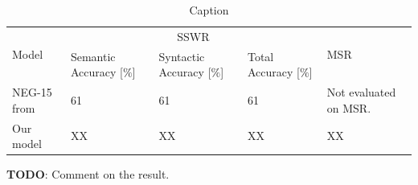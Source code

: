 \begin{table}[h]
    \centering
    \begin{tabular}{@{}p{4cm}p{2.25cm}p{2.25cm}p{2.25cm}p{4cm}@{}}
        \toprule
        \multirow{2}{4cm}{\centering Model} &
        \multicolumn{3}{c}{SSWR \cite{mikolov2013a}} &
        \multirow{2}{4cm}{\centering MSR \cite{mikolov-etal-2013-linguistic}} \\
        \cline{2-4} & Semantic Accuracy [$\%$] & Syntactic Accuracy [$\%$] & Total \newline Accuracy [$\%$] \\
        \midrule
        NEG-15 from \cite{mikolov2013b} & 61 & 61 & 61 & Not evaluated on MSR. \\
        Our model & XX & XX & XX & XX \\
        \bottomrule
    \end{tabular}
    \caption{Caption}
    \label{table:word2vec-eval-empirical-results}
\end{table}

\textbf{TODO}: Comment on the result.
